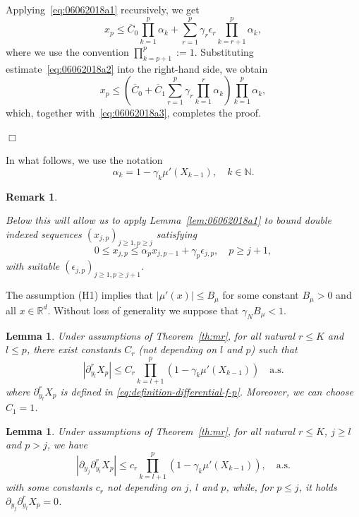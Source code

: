 \documentclass[bj]{imsart}
\newcommand{\proofendsign}{$\Box$}
\newtheorem{lem}[thm]{Lemma}
\newtheorem{remark}{Remark}
\newenvironment{proof}{{\noindent \bf Proof }}
 {{\hspace*{\fill}\proofendsign\par\bigskip}}
\newcommand*{\ol}{\overline}
\begin{document}
\begin{proof}
Applying~\eqref{eq:06062018a1} recursively, we get
$$
x_p\le\ol C_0\prod_{k=1}^p \alpha_k
+\sum_{r=1}^p \gamma_r\epsilon_r
\prod_{k=r+1}^p \alpha_k,
$$
where we use the convention $\prod_{k=p+1}^p:=1$.
Substituting estimate~\eqref{eq:06062018a2}
into the right-hand side, we obtain
$$
x_p\le\left(\ol C_0+\ol C_1
\sum_{r=1}^p \gamma_r \prod_{k=1}^r \alpha_k
\right)
\prod_{k=1}^p \alpha_k,
$$
which, together with~\eqref{eq:06062018a3}, completes the proof.
\end{proof}

In what follows, we use the notation
\begin{equation}
\label{eq:definition-alpha}
\alpha_k=1-\gamma_k \mu'(X_{k-1}),\quad k\in\mathbb N.
\end{equation}

\begin{remark}\label{rem:10062018a1}

Below this will allow us to apply
Lemma~\ref{lem:06062018a1}
to bound double indexed sequences
$(x_{j,p})_{j\ge1,p\ge j}$
satisfying
$$
0\le x_{j,p}\le\alpha_p x_{j,p-1}+\gamma_p \epsilon_{j,p},\quad p\ge j+1,
$$
with suitable $(\epsilon_{j,p})_{j\ge1,p\ge j+1}$.
\end{remark}
The assumption (H1) implies that  $|\mu'(x)|\leq B_\mu$ for some constant $B_\mu>0$ and all $x\in \mathbb{R}^d$. Without loss of generality we suppose that $\gamma_N B_\mu<1.$
\begin{lem}\label{lem:06062018a2}
Under assumptions of Theorem~\ref{th:mr},
for all natural $r\le K$ and $l\le p$, there exist constants $C_r$ (not depending on $l$ and $p$) such that
\begin{equation}
\label{eq:08062018b2}
\left|\partial_{y_l}^r X_p \right| \le C_r\prod_{k=l+1}^p (1-\gamma_k\mu'(X_{k-1}))\quad \text{a.s.} 
\end{equation}
where $\partial_{y_l}^r X_p$ is defined in \eqref{eq:definition-differential-f-p}. Moreover, we can choose $C_1=1$.
\end{lem}
\begin{lem}\label{lem:06062018a3}
Under assumptions of Theorem~\ref{th:mr},
for all natural $r\le K$, $j\ge l$ and $p>j$, we have
\begin{equation}\label{eq:08062018b3}
\left|\partial_{y_j} \partial_{y_l}^r X_p\right|
\le c_r\prod_{k=l+1}^p (1-\gamma_k\mu'(X_{k-1})), \quad \text{a.s.}
\end{equation}
with some constants $c_r$
not depending on $j$, $l$ and $p$,
while, for $p\le j$, it holds
$\partial_{y_{j}}\partial_{y_{l}}^{r}X_{p}=0$.
\end{lem}
\end{document}
